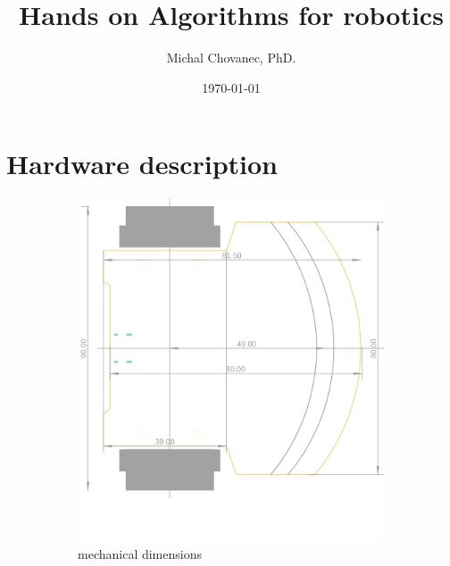 \documentclass[12pt,twoside,onecolumn,openany,extrafontsizes,dvipsnames]{memoir}
\title{Hands on Algorithms for robotics}
\author{Michal Chovanec, PhD.}
\date{\today}
\begin{document}
\maketitle


\chapter{Hardware description}


    \newpage
    \begin{figure}[h]
        \begin{subfigure}{.5\textwidth}
            \centering
            \includegraphics[scale=0.35]{../images/robot/board_dims_a.png}
            \caption{mechanical dimensions}
            \label{fig:mechanical_dimensions}
        \end{subfigure}%
        \begin{subfigure}{.5\textwidth}
            \centering

\end{subfigure}
\end{figure}
\end{document}

